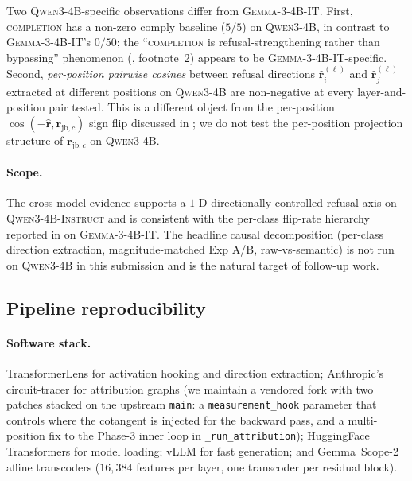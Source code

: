 \documentclass{article}
\newcommand{\rhat}{\hat{\bm{r}}}
\newcommand{\rjbc}{\bm{r}_{\mathrm{jb},c}}
\newcommand{\gemma}{\textsc{Gemma-3-4B-IT}}
\begin{document}
Two \textsc{Qwen3-4B}-specific observations differ from \gemma{}.
First, \textsc{completion} has a non-zero comply baseline ($5/5$) on
\textsc{Qwen3-4B}, in contrast to \gemma{}'s $0/50$; the
``\textsc{completion} is refusal-strengthening rather than
bypassing'' phenomenon (, footnote~2) appears
to be \gemma{}-specific. Second, \emph{per-position pairwise
cosines} between refusal directions $\rhat^{(\ell)}_{i}$ and
$\rhat^{(\ell)}_{j}$ extracted at different positions on
\textsc{Qwen3-4B} are non-negative at every layer-and-position pair
tested. This is a different object from the per-position
$\cos(-\rhat, \rjbc)$ sign flip discussed in
; we do not test the per-position projection
structure of $\rjbc$ on \textsc{Qwen3-4B}.

\paragraph{Scope.} The cross-model evidence supports a $1$-D
directionally-controlled refusal axis on
\textsc{Qwen3-4B-Instruct} and is consistent with the per-class
flip-rate hierarchy reported in  on
\gemma{}. The headline causal decomposition (per-class direction
extraction, magnitude-matched Exp A/B, raw-vs-semantic) is not run
on \textsc{Qwen3-4B} in this submission and is the natural target of
follow-up work.

\subsection{Pipeline reproducibility}
\label{app:repro}

\paragraph{Software stack.}
TransformerLens \citep{nanda2022transformerlens} for activation
hooking and direction extraction; Anthropic's circuit-tracer
\citep{lindsey2025biology} for attribution graphs (we maintain a
vendored fork with two patches stacked on the upstream
\texttt{main}: a \texttt{measurement\_hook} parameter that controls
where the cotangent is injected for the backward pass, and a
multi-position fix to the Phase-3 inner loop in
\texttt{\_run\_attribution}); HuggingFace Transformers
\citep{wolf2020transformers} for model loading; vLLM
\citep{kwon2023vllm} for fast generation; and Gemma~Scope-2 affine
transcoders \citep{lieberum2024gemmascope} ($16{,}384$ features per
layer, one transcoder per residual block).
\end{document}
